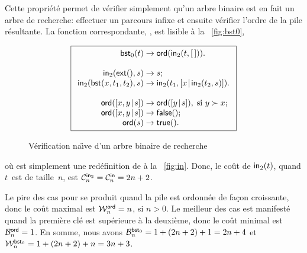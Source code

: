 Cette propriété permet de vérifier simplement qu'un arbre binaire est
en fait un arbre de recherche: effectuer un parcours infixe et ensuite
vérifier l'ordre de la pile résultante. La fonction correspondante,
, est lisible à la
\fig~\vref{fig:bst0},
\begin{figure}[t]
\begin{equation*}
\boxed{
\begin{array}{r@{\;}l@{\;}l}
\fun{bst}_0(t) & \rightarrow & \fun{ord}(\fun{in}_2(t,\el)).\\
\\
\fun{in}_2(\fun{ext}(),s) & \rightarrow & s;\\
\fun{in}_2(\fun{bst}(x,t_1,t_2),s) & \rightarrow
  & \fun{in}_2(t_1,\cons{x}{\fun{in}_2(t_2,s)}).\\
\\
\fun{ord}(\cons{x,y}{s}) & \rightarrow & \fun{ord}(\cons{y}{s}),
\;\text{si \(y \succ x\)};\\
\fun{ord}(\cons{x,y}{s}) & \rightarrow & \fun{false}();\\
\fun{ord}(s) & \rightarrow & \fun{true}().
\end{array}}
\end{equation*}
\caption{Vérification na\"{\i}ve d'un arbre binaire de recherche}
\label{fig:bst0}
\end{figure}
où  est simplement une
redéfinition de  à la
\fig~\vref{fig:in}. Donc, le coût de \(\fun{in}_2(t)\), quand
\(t\)~est de taille~\(n\), est \(\C{\fun{in}_2}{n} = \C{\fun{in}}{n} =
2n + 2\).

Le pire des cas pour  se produit
quand la pile est ordonnée de façon croissante, donc le coût maximal
est \(\W{\fun{ord}}{n} = n\), si \(n > 0\). Le meilleur des cas est
manifesté quand la première clé est supérieure à la deuxième, donc le
coût minimal est \(\B{\fun{ord}}{n} = 1\). En somme, nous avons
\(\B{\fun{bst}_0}{n} = 1 + (2n+2) + 1 = 2n + 4\) et
\(\W{\fun{bst}_0}{n} = 1 + (2n+2) + n = 3n + 3\).

